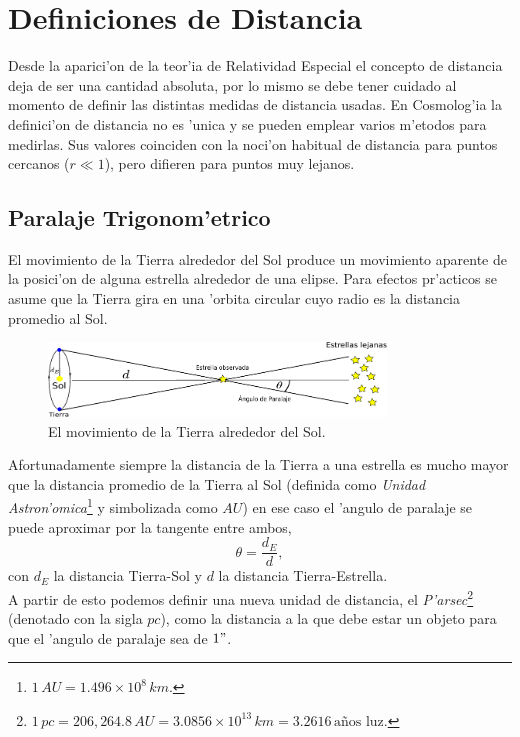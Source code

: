 \section{Definiciones de Distancia}
Desde la aparici'on de la teor'ia de Relatividad Especial el concepto de distancia deja de ser una cantidad absoluta, por lo mismo 
se debe tener cuidado al momento de definir las distintas medidas de distancia usadas. En Cosmolog'ia la definici'on de distancia no es 'unica y se pueden 
emplear varios m'etodos para medirlas. Sus valores coinciden con la noci'on habitual de distancia para 
puntos cercanos ($r\ll 1$), pero difieren para puntos muy lejanos.\\
\subsection{Paralaje Trigonom'etrico}
El movimiento de la Tierra alrededor del Sol produce un movimiento aparente de la posici'on de alguna estrella alrededor
de una elipse. Para efectos pr'acticos se asume que la Tierra gira en una 'orbita circular cuyo radio es la distancia promedio
al Sol.
\begin{figure}[h]
  \centering
\includegraphics[width=0.8\textwidth]{fig/paralaje3.pdf}
 \caption{El movimiento de la Tierra alrededor del Sol.}
  \label{Paralaje}
  \end{figure}
Afortunadamente siempre la distancia de la Tierra a una estrella es mucho mayor que la distancia 
promedio de la Tierra al Sol (definida como \textit{Unidad Astron'omica}\footnote{$1\,AU= 1.496\times 10^{8}\,km$.} y simbolizada como $AU$) en ese caso el 'angulo de paralaje se puede aproximar
por la tangente entre ambos,
\begin{equation}
 \theta=\frac{d_{E}}{d},
\end{equation}
con $d_{E}$ la distancia Tierra-Sol y $d$ la distancia Tierra-Estrella.\\
A partir de esto podemos definir una nueva unidad de distancia, el \textit{P'arsec}\footnote{$1\,pc=206,264.8\,AU= 3.0856\times 10^{13}\,km = 3.2616\,\mbox{a\~nos luz}$.} (denotado con la sigla $pc$), como la distancia a la que 
debe estar un objeto para que el 'angulo de paralaje sea de $1"$. 
